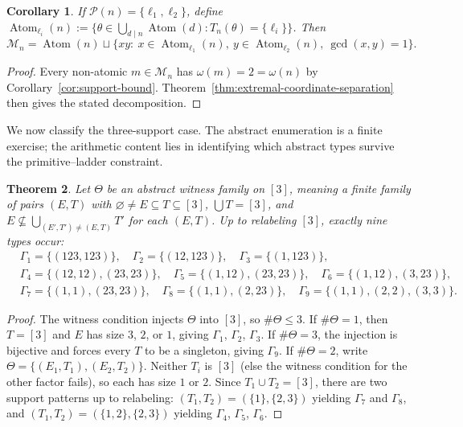 \documentclass[11pt,letterpaper]{article}
\numberwithin{equation}{section}
\theoremstyle{plain}
\newtheorem{theorem}{Theorem}[section]
\newtheorem{corollary}[theorem]{Corollary}
\theoremstyle{definition}
\theoremstyle{remark}
\DeclareMathOperator{\Atom}{Atom}
\begin{document}
\begin{corollary}\label{cor:two-support-complete-classification}
If $\mathcal P(n)=\{\ell_1,\ell_2\}$, define
$\Atom_{\ell_i}(n):=\{\theta\in\bigcup_{d\mid n}\Atom(d):
T_n(\theta)=\{\ell_i\}\}$. Then
\[
\mathcal M_n
=\Atom(n)\sqcup
\{xy:\ x\in\Atom_{\ell_1}(n),\ y\in\Atom_{\ell_2}(n),\ \gcd(x,y)=1\}.
\]
\end{corollary}

\begin{proof}
Every non-atomic $m\in\mathcal M_n$ has
$\omega(m)=2=\omega(n)$ by Corollary~\ref{cor:support-bound}.
Theorem~\ref{thm:extremal-coordinate-separation} then gives the stated
decomposition.
\end{proof}

We now classify the three-support case. The abstract enumeration is a finite
exercise; the arithmetic content lies in identifying which abstract types
survive the primitive--ladder constraint.

\begin{theorem}\label{thm:abstract-three-types}
Let $\Theta$ be an abstract witness family on $[3]$, meaning a finite family
of pairs $(E,T)$ with $\varnothing\neq E\subseteq T\subseteq[3]$,
$\bigcup T=[3]$, and
$E\nsubseteq\bigcup_{(E',T')\neq(E,T)}T'$ for each $(E,T)$. Up to
relabeling $[3]$, exactly nine types occur:
\begin{align*}
&\Gamma_1=\{(123,123)\},\quad
\Gamma_2=\{(12,123)\},\quad
\Gamma_3=\{(1,123)\},\\
&\Gamma_4=\{(12,12),(23,23)\},\quad
\Gamma_5=\{(1,12),(23,23)\},\quad
\Gamma_6=\{(1,12),(3,23)\},\\
&\Gamma_7=\{(1,1),(23,23)\},\quad
\Gamma_8=\{(1,1),(2,23)\},\quad
\Gamma_9=\{(1,1),(2,2),(3,3)\}.
\end{align*}
\end{theorem}

\begin{proof}
The witness condition injects $\Theta$ into $[3]$, so $\#\Theta\le 3$.
If $\#\Theta=1$, then $T=[3]$ and $E$ has size $3$, $2$, or $1$, giving
$\Gamma_1$, $\Gamma_2$, $\Gamma_3$.
If $\#\Theta=3$, the injection is bijective and forces every $T$ to be a
singleton, giving $\Gamma_9$.
If $\#\Theta=2$, write $\Theta=\{(E_1,T_1),(E_2,T_2)\}$. Neither $T_i$ is
$[3]$ (else the witness condition for the other factor fails), so each has
size $1$ or $2$. Since $T_1\cup T_2=[3]$, there are two support patterns up
to relabeling: $(T_1,T_2)=(\{1\},\{2,3\})$ yielding $\Gamma_7$ and
$\Gamma_8$, and $(T_1,T_2)=(\{1,2\},\{2,3\})$ yielding $\Gamma_4$,
$\Gamma_5$, $\Gamma_6$.
\end{proof}
\end{document}

